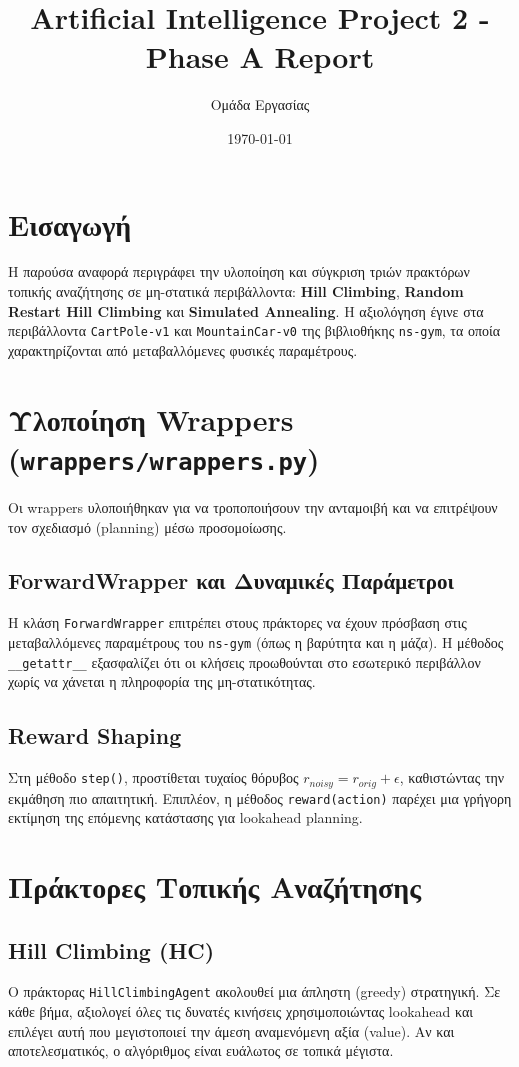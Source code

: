 \documentclass[11pt,a4paper]{article}
\title{Artificial Intelligence Project 2 - Phase A Report}
\author{Ομάδα Εργασίας}
\date{\today}
\begin{document}
\maketitle

\section{Εισαγωγή}
Η παρούσα αναφορά περιγράφει την υλοποίηση και σύγκριση τριών πρακτόρων τοπικής αναζήτησης σε μη-στατικά περιβάλλοντα: \textbf{Hill Climbing}, \textbf{Random Restart Hill Climbing} και \textbf{Simulated Annealing}. Η αξιολόγηση έγινε στα περιβάλλοντα \texttt{CartPole-v1} και \texttt{MountainCar-v0} της βιβλιοθήκης \texttt{ns-gym}, τα οποία χαρακτηρίζονται από μεταβαλλόμενες φυσικές παραμέτρους.

\section{Υλοποίηση Wrappers (\texttt{wrappers/wrappers.py})}
Οι wrappers υλοποιήθηκαν για να τροποποιήσουν την ανταμοιβή και να επιτρέψουν τον σχεδιασμό (planning) μέσω προσομοίωσης.

\subsection{ForwardWrapper και Δυναμικές Παράμετροι}
Η κλάση \texttt{ForwardWrapper} επιτρέπει στους πράκτορες να έχουν πρόσβαση στις μεταβαλλόμενες παραμέτρους του \texttt{ns-gym} (όπως η βαρύτητα και η μάζα). Η μέθοδος \texttt{\_\_getattr\_\_} εξασφαλίζει ότι οι κλήσεις προωθούνται στο εσωτερικό περιβάλλον χωρίς να χάνεται η πληροφορία της μη-στατικότητας.

\subsection{Reward Shaping}
Στη μέθοδο \texttt{step()}, προστίθεται τυχαίος θόρυβος $r_{noisy} = r_{orig} + \epsilon$, καθιστώντας την εκμάθηση πιο απαιτητική. Επιπλέον, η μέθοδος \texttt{reward(action)} παρέχει μια γρήγορη εκτίμηση της επόμενης κατάστασης για lookahead planning.

\section{Πράκτορες Τοπικής Αναζήτησης}

\subsection{Hill Climbing (HC)}
Ο πράκτορας \texttt{HillClimbingAgent} ακολουθεί μια άπληστη (greedy) στρατηγική. Σε κάθε βήμα, αξιολογεί όλες τις δυνατές κινήσεις χρησιμοποιώντας lookahead και επιλέγει αυτή που μεγιστοποιεί την άμεση αναμενόμενη αξία (value). Αν και αποτελεσματικός, ο αλγόριθμος είναι ευάλωτος σε τοπικά μέγιστα.
\end{document}
